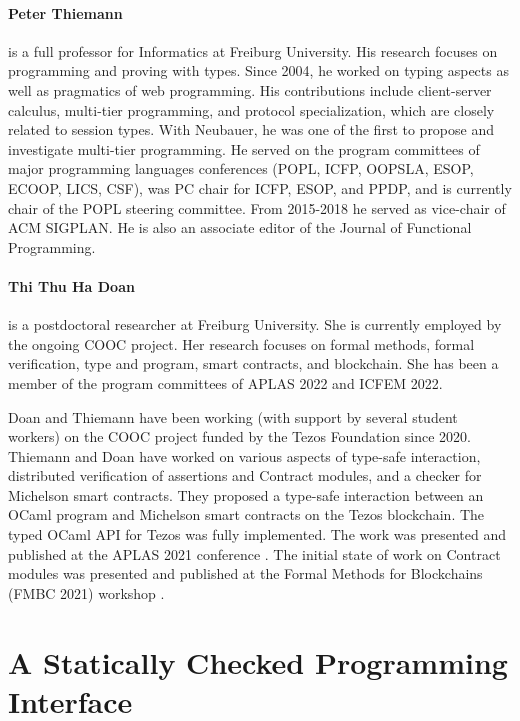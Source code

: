 \documentclass[a4paper,11pt]{article}
\begin{document}
\paragraph{Peter Thiemann}
is a full professor for Informatics at Freiburg University.
His research focuses on programming and proving with types. Since 2004, he worked on
typing aspects as well as pragmatics of web programming. His contributions include client-server calculus, multi-tier programming, and protocol specialization, which are closely related to session types. With Neubauer, he was one of the first to propose and investigate multi-tier
programming. He served on the program committees of major programming languages conferences (POPL,
ICFP, OOPSLA, ESOP, ECOOP, LICS, CSF), was PC chair for ICFP, ESOP, and PPDP, and is currently chair of the POPL steering committee. From 2015-2018 he served as vice-chair of ACM
SIGPLAN. He is also an associate editor of the Journal of Functional Programming.


\paragraph{Thi Thu Ha Doan} is a postdoctoral researcher at Freiburg University. She is currently employed by the ongoing COOC project. Her research focuses on formal methods, formal verification, type and program, smart contracts, and blockchain. She has been a member of the program committees of APLAS 2022 and ICFEM 2022. 

Doan and Thiemann have been working (with support by several student workers) on the COOC project funded by the Tezos Foundation  since 2020. Thiemann and Doan have worked on various aspects of type-safe interaction, distributed verification of assertions and Contract modules, and a checker for Michelson smart contracts. They proposed a type-safe interaction between an OCaml program and Michelson smart contracts on the Tezos blockchain. The typed OCaml API for Tezos was fully implemented. The work was presented and published at the APLAS 2021 conference \cite{DBLP:conf/aplas/DoanT21}. The initial state of work on Contract modules was presented and published at the Formal Methods for Blockchains (FMBC 2021) workshop \cite{DBLP:conf/cav/Doan021}. 


\section{A Statically Checked Programming Interface}
\label{sec:checked-programming-interfect}
\end{document}
